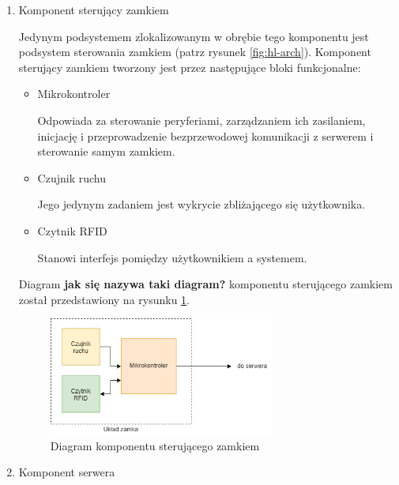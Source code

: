                 \begin{enumerate}

                    \item Komponent sterujący zamkiem
                    
                        Jedynym podsystemem zlokalizowanym w obrębie tego komponentu jest podsystem sterowania zamkiem (patrz rysunek \ref{fig:hl-arch}).
                        Komponent sterujący zamkiem tworzony jest przez następujące bloki funkcjonalne:

                        \begin{itemize}
                            \item Mikrokontroler

                                Odpowiada za sterowanie peryferiami, zarządzaniem ich zasilaniem, inicjację i przeprowadzenie bezprzewodowej komunikacji z serwerem i sterowanie samym zamkiem.

                            \item Czujnik ruchu

                                Jego jedynym zadaniem jest wykrycie zbliżającego się użytkownika.

                            \item Czytnik RFID

                                Stanowi interfejs pomiędzy użytkownikiem a systemem.

                        \end{itemize}

                        Diagram \textbf{jak się nazywa taki diagram?} komponentu sterującego zamkiem został przedstawiony na rysunku \ref{fig:lock-arch}.

                        \begin{figure}
                            \centering
                            \includegraphics[width=0.7\textwidth]{chapters/images/lock.png}
                            \caption{Diagram komponentu sterującego zamkiem}
                            \label{fig:lock-arch}
                        \end{figure}

                    \item Komponent serwera

                \end{enumerate}

                    

